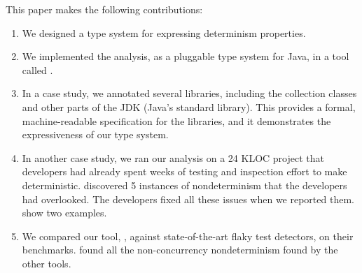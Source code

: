 This paper makes the following contributions:
\begin{enumerate}
  \item We designed a type system for expressing determinism properties.

  \item We implemented the analysis, as a pluggable type system for Java, in a
    tool called \theDeterminismChecker.

  \item
  In a case study, we annotated several libraries, including the collection
    classes and other parts of the JDK (Java's standard library).  This
    provides a formal, machine-readable specification for the libraries, and
    it demonstrates the expressiveness of our type system.

  \item In another case study, we ran our analysis on a 24 KLOC project that
    developers had already spent weeks of testing and inspection effort to
    make deterministic.  \TheDeterminismChecker
    discovered 5 instances of nondeterminism that the developers had
    overlooked.
    The developers fixed all these issues when we reported them.
     show two examples.

  \item We compared our tool, \theDeterminismChecker, against state-of-the-art flaky test
    detectors, on their benchmarks.
    \TheDeterminismChecker found all the non-concurrency nondeterminism
    found by the other tools.

\end{enumerate}



